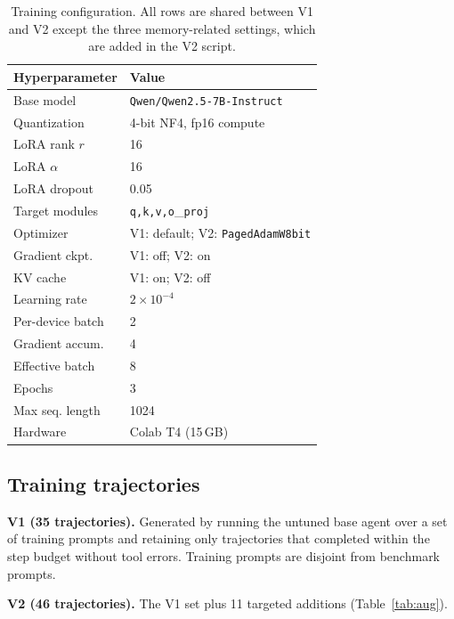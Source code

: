 \documentclass[10pt,twocolumn]{article}
\newcommand{\code}[1]{\texttt{#1}}
\begin{document}
\begin{table}[t]
\centering
\caption{Training configuration. All rows are shared between V1 and V2 except
the three memory-related settings, which are added in the V2 script.}
\label{tab:train}
\small
\begin{tabular}{ll}
\toprule
Hyperparameter & Value \\
\midrule
Base model         & \code{Qwen/Qwen2.5-7B-Instruct} \\
Quantization       & 4-bit NF4, fp16 compute \\
LoRA rank $r$      & 16 \\
LoRA $\alpha$      & 16 \\
LoRA dropout       & 0.05 \\
Target modules     & \code{q,k,v,o}\_\code{proj} \\
\midrule
Optimizer          & V1: default; V2: \code{PagedAdamW8bit} \\
Gradient ckpt.     & V1: off; V2: on \\
KV cache           & V1: on; V2: off \\
\midrule
Learning rate      & $2\times10^{-4}$ \\
Per-device batch   & 2 \\
Gradient accum.    & 4 \\
Effective batch    & 8 \\
Epochs             & 3 \\
Max seq. length    & 1024 \\
Hardware           & Colab T4 (15\,GB) \\
\bottomrule
\end{tabular}
\end{table}

\subsection{Training trajectories}

\textbf{V1 (35 trajectories).} Generated by running the untuned base agent over a set of training prompts and retaining only trajectories that completed within the step budget without tool errors. Training prompts are disjoint from benchmark prompts.

\textbf{V2 (46 trajectories).} The V1 set plus 11 targeted additions (Table~\ref{tab:aug}).
\end{document}
